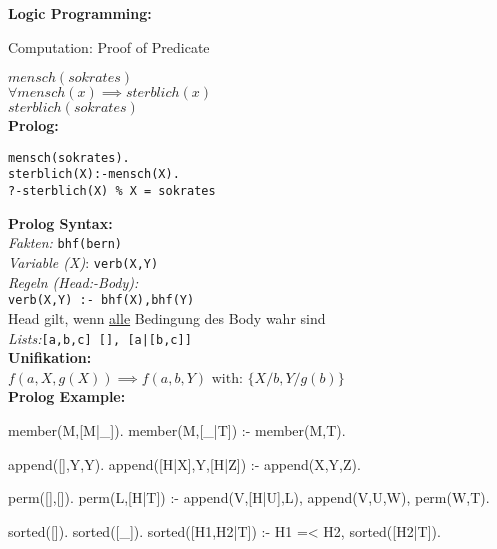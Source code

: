 \begin{breakbox}
\textbf{Logic Programming:}
\begin{mdframed}
  \begin{center}
  	Computation: Proof of Predicate 
  \end{center}
\end{mdframed}

$mensch(sokrates)$ \\
$\forall mensch(x) \implies sterblich(x)$ \\
$sterblich(sokrates)$\\

\textbf{Prolog:}
\vspace{-5mm}
\begin{verbatim}
mensch(sokrates).
sterblich(X):-mensch(X).
?-sterblich(X) % X = sokrates
\end{verbatim}
\textbf{Prolog Syntax:}\\
\emph{Fakten:} \texttt{bhf(bern)}\\
\emph{Variable (X)}: \texttt{verb(X,Y)}\\
\emph{Regeln (Head:-Body):}\\ \texttt{verb(X,Y) :- bhf(X),bhf(Y)}\\
Head gilt, wenn \underline{alle} Bedingung des Body wahr sind\\
\emph{Lists:}\texttt{[a,b,c] [], [a|[b,c]]}\\

\textbf{Unifikation:}\\
$f(a,X,g(X)) \implies f(a,b,Y)$ 
$\text{with: } \{X/b, Y/g(b)\}$\\

\textbf{Prolog Example:}\\
\vspace{-5mm}
\begin{prologcode}

member(M,[M|_]).
member(M,[_|T]) :- member(M,T).

append([],Y,Y).
append([H|X],Y,[H|Z]) :- append(X,Y,Z).

perm([],[]).
perm(L,[H|T]) :- append(V,[H|U],L), append(V,U,W), perm(W,T).


sorted([]).
sorted([_]).
sorted([H1,H2|T]) :- H1 =< H2, sorted([H2|T]).


\end{prologcode}
\end{breakbox}
